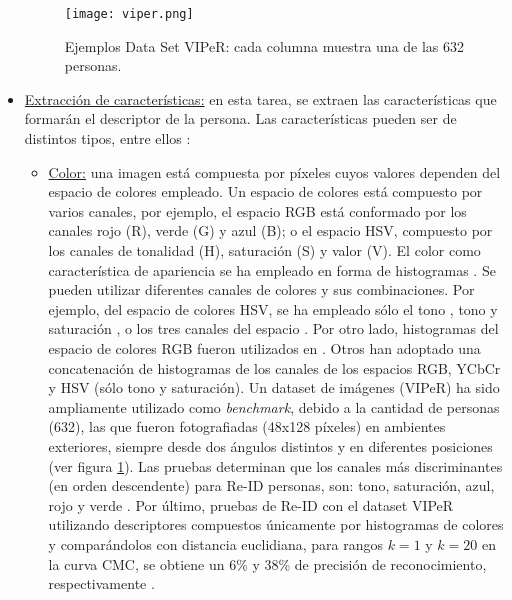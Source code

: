\documentclass[../memoria.tex]{subfiles}
\begin{document}
\begin{itemize}
	\begin{figure}
	  \centering
	  \texttt{[image: viper.png]}
	  \caption{Ejemplos Data Set VIPeR: cada columna muestra una de las 632 personas.}
	  \label{fig:viper}
	\end{figure}

	\item \underline{Extracción de características:} en esta tarea, se extraen las características que formarán el descriptor de la persona. Las características pueden ser de distintos tipos, entre ellos \cite{vezzani2013people}: 

		\begin{itemize}
			\item \underline{Color:} una imagen está compuesta por píxeles cuyos valores dependen del espacio de colores empleado. Un espacio de colores está compuesto por varios canales, por ejemplo, el espacio RGB está conformado por los canales rojo (R), verde (G) y azul (B); o el espacio HSV, compuesto por los canales de tonalidad (H), saturación (S) y valor (V). El color como característica de apariencia se ha empleado en forma de histogramas \cite{gheissari2006person, gray2008viewpoint, javed2008modeling, oliveira2009people, farenzena2010person, prosser2010person, zheng2011person}. Se pueden utilizar diferentes canales de colores y sus combinaciones. Por ejemplo, del espacio de colores HSV, se ha empleado sólo el tono \cite{oliveira2009people},  tono y saturación \cite{gheissari2006person}, o los tres canales del espacio \cite{farenzena2010person}. Por otro lado, histogramas del espacio de colores RGB fueron utilizados en \cite{prosserxiang2008multi, javed2008modeling, berdugo2010object}. Otros\cite{gray2008viewpoint, prosser2010person, zheng2011person} han adoptado una concatenación de histogramas de los canales de los espacios RGB, YCbCr y HSV (sólo tono y saturación). Un dataset de imágenes (VIPeR) \cite{gray2008viewpoint} ha sido ampliamente utilizado como \emph{benchmark}, debido a la cantidad de personas (632), las que fueron fotografiadas (48x128 píxeles) en ambientes exteriores, siempre desde dos ángulos distintos y en diferentes posiciones (ver figura \ref{fig:viper}). Las pruebas determinan que los canales más discriminantes (en orden descendente) para Re-ID personas, son: tono, saturación, azul, rojo y verde \cite{mazzon2012person}. Por último, pruebas de Re-ID con el dataset VIPeR utilizando descriptores compuestos únicamente por histogramas de colores y comparándolos con distancia euclidiana, para rangos $k=1$ y $k=20$ en la curva CMC, se obtiene un 6\% y 38\% de precisión de reconocimiento, respectivamente \cite{hirzer2012relaxed}.
			

\end{itemize}
\end{itemize}
\end{document}
